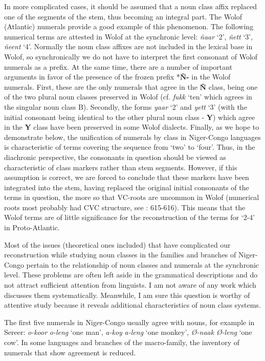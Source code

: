 In more complicated cases, it should be assumed that a noun class affix replaced one of the segments of the stem, thus becoming an integral part. The Wolof (Atlantic) numerals provide a good example of this phenomenon. The following numerical terms are attested in Wolof at the synchronic level: \textit{ñaar} ‘2’, \textit{ñett} ‘3’, \textit{ñeent} ‘4’. Normally the noun class affixes are not included in the lexical base in Wolof, so synchronically we do not have to interpret the first consonant of Wolof numerals as a prefix. At the same time, there are a number of important arguments in favor of the presence of the frozen prefix *\textbf{Ñ-} in the Wolof numerals. First, these are the only numerals that agree in the \textbf{Ñ} class, being one of the two plural noun classes preserved in Wolof (cf. \textit{fukk} ‘ten’ which agrees in the singular noun class B). Secondly, the forms \textit{yaar} ‘2’ and \textit{yett} ‘3’ (with the initial consonant being identical to the other plural noun class - \textbf{Y}) which agree in the \textbf{Y} class have been preserved in some Wolof dialects. Finally, as we hope to demonstrate below, the unification of numerals by class in Niger-Congo languages is characteristic of terms covering the sequence from ‘two’ to ‘four’. Thus, in the diachronic perspective, the consonants in question should be viewed as characteristic of class markers rather than stem segments. However, if this assumption is correct, we are forced to conclude that these markers have been integrated into the stem, having replaced the original initial consonants of the terms in question, the more so that VC-roots are uncommon in Wolof (numerical roots most probably had CVC structure, see \citealt{PozdniakovRobert2015}: 615-616). This means that the Wolof terms are of little significance for the reconstruction of the terms for ‘2-4’ in Proto-Atlantic.

Most of the issues (theoretical ones included) that have complicated our reconstruction while studying noun classes in the families and branches of Niger-Congo pertain to the relationship of noun classes and numerals at the synchronic level. These problems are often left aside in the grammatical descriptions and do not attract sufficient attention from linguists. I am not aware of any work which discusses them systematically. Meanwhile, I am sure this question is worthy of attentive study because it reveals additional characteristics of noun class systems. 

The first five numerals in Niger-Congo usually agree with nouns, for example in Sereer: \textit{o-koor} \textit{o-leng} ‘one man’, \textit{a-koy} \textit{a-leng} ‘one monkey’, \textit{Ø-naak} \textit{Ø-leng} ‘one cow’.  In some languages and branches of the macro-family, the inventory of numerals that show agreement is reduced. 

